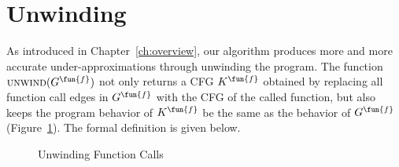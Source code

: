 
\section{Unwinding}\label{sec:unwinding}
As introduced in Chapter~\ref{ch:overview}, our algorithm produces more and more accurate under-approximations through unwinding the program.
The function $\textsc{unwind}(G^\fun{f})$ not only returns a CFG $K^\fun{f}$ obtained by replacing all function call edges in $G^\fun{f}$ with the CFG of the called function, but also keeps the program behavior of $K^\fun{f}$ be the same as the behavior of $G^\fun{f}$ (Figure~\ref{figure:unwinding}). The formal definition is given below.

\begin{figure}[t]
  \centering

  \caption{Unwinding Function Calls}
  \label{figure:unwinding}
\end{figure}

